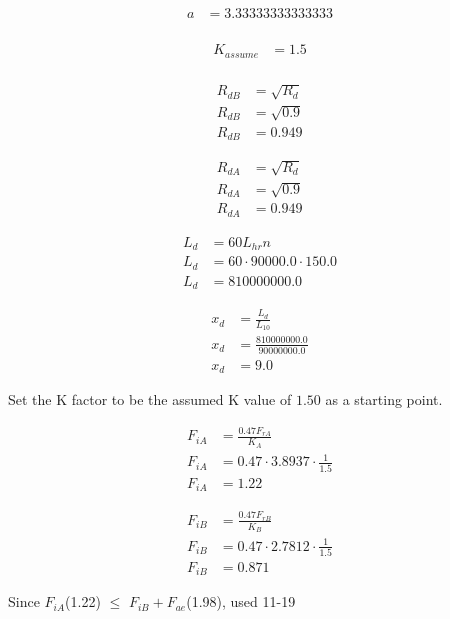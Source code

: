 \begin{align*}
    a &= 3.33333333333333\\
\end{align*}

\begin{align*}
    K_{assume} &= 1.5\\
\end{align*}

\begin{align*}
    R_{dB} &= \sqrt{R_{d}}\\
    R_{dB} &= \sqrt{0.9}\\
    R_{dB} &= 0.949
\end{align*}

\begin{align*}
    R_{dA} &= \sqrt{R_{d}}\\
    R_{dA} &= \sqrt{0.9}\\
    R_{dA} &= 0.949
\end{align*}

\begin{align*}
    L_{d} &= 60 L_{hr} n\\
    L_{d} &= 60 \cdot 90000.0 \cdot 150.0\\
    L_{d} &= 810000000.0
\end{align*}

\begin{align*}
    x_{d} &= \frac{L_{d}}{L_{10}}\\
    x_{d} &= \frac{810000000.0}{90000000.0}\\
    x_{d} &= 9.0
\end{align*}

Set the K factor to be the assumed K value of $1.50$ as a starting point.

\begin{align*}
    F_{iA} &= \frac{0.47 F_{rA}}{K_{A}}\\
    F_{iA} &= 0.47 \cdot 3.8937 \cdot \frac{1}{1.5}\\
    F_{iA} &= 1.22
\end{align*}

\begin{align*}
    F_{iB} &= \frac{0.47 F_{rB}}{K_{B}}\\
    F_{iB} &= 0.47 \cdot 2.7812 \cdot \frac{1}{1.5}\\
    F_{iB} &= 0.871
\end{align*}

Since $F_{iA}$(1.22) $\leq$ $F_{iB} + F_{ae}$(1.98), used 11-19

